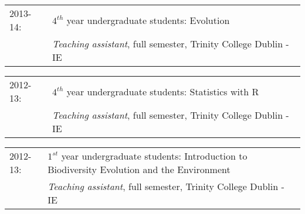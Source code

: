 \documentclass[10pt,a4paper]{article}
\begin{document}
{\begin{tabular}{ll}
\end{tabular}
\begin{tabular}{ll}
2013-14: & $4^{th}$ year undergraduate students: Evolution\\
         & \textit{Teaching assistant}, full semester, Trinity College Dublin - IE\\
\end{tabular}
\begin{tabular}{ll}
2012-13: & $4^{th}$ year undergraduate students: Statistics with R\\
         & \textit{Teaching assistant}, full semester, Trinity College Dublin - IE\\
\end{tabular}
\begin{tabular}{ll}
2012-13: & $1^{st}$ year undergraduate students: Introduction to Biodiversity Evolution and the Environment\\
         & \textit{Teaching assistant}, full semester, Trinity College Dublin - IE\\
\end{tabular}
\begin{tabular}{ll}
\end{tabular}

\bigskip

}
\end{document}
